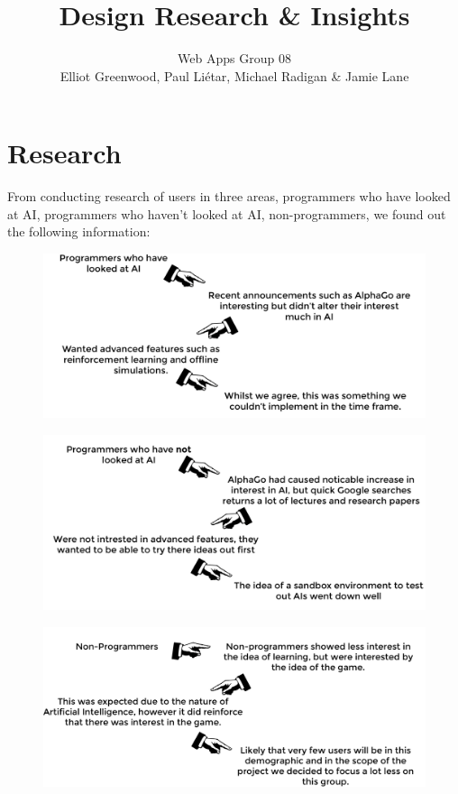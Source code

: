 \documentclass[a4paper, 6pt]{article}
\title{Design Research \& Insights}
\author{Web Apps Group 08 \\ Elliot Greenwood, Paul Li\'etar, Michael Radigan \& Jamie Lane}
\date{}
\begin{document}
\maketitle

\section{Research}
\label{sec:Research}
From conducting research of users in three areas, programmers who have looked at AI, programmers who haven't looked at AI, non-programmers, we found out the following information:

\begin{figure}[ht!]
  \centering
  \includegraphics[width=0.8\linewidth]{design_research_01.png}
\end{figure}
\begin{figure}[ht!]
  \centering
  \includegraphics[width=0.8\linewidth]{design_research_02.png}
\end{figure}
\begin{figure}[ht!]
  \centering
  \includegraphics[width=0.8\linewidth]{design_research_03.png}
\end{figure}
\quad
\end{document}
